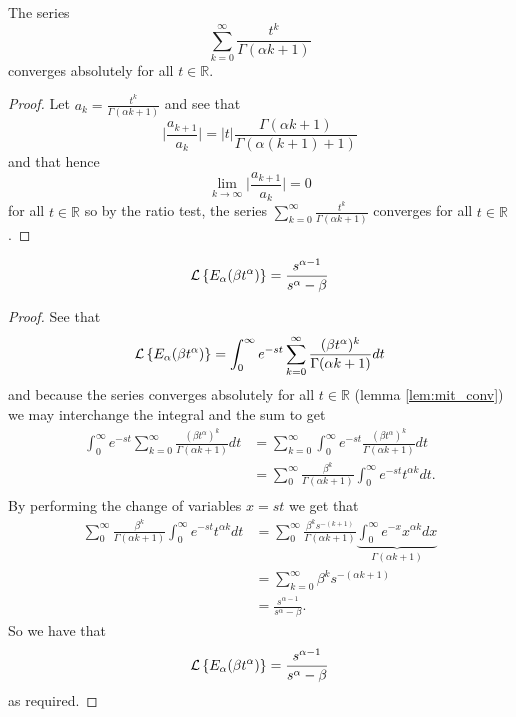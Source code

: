 \documentclass{article}
\begin{document}
\begin{lemma}
\label{lem:mit_conv}

	The series
	$$
		\sum_{k=0}^{\infty} \frac{t^k}{\Gamma(\alpha k + 1)} 
	$$
  	converges absolutely for all $ t \in \mathbb{R} $.
\end{lemma}
\begin{proof}
	Let $ a_k = \frac{t^k}{\Gamma(\alpha k + 1) }$ and see that
	$$ \lvert \frac{a_{k+1}}{a_k} \rvert = |t| \frac{\Gamma(\alpha k + 1) }{\Gamma(\alpha(k+1) + 1)} $$
	and that hence 
	$$
		\lim_{k \longrightarrow \infty} \lvert \frac{a_{k+1}}{a_k} \rvert = 0
	$$
	for all $ t \in \mathbb{R} $ so by the ratio test, the series $ \sum_{k=0}^{\infty} \frac{t^k}{\Gamma(\alpha k + 1)}  $
	converges for all $ t \in \mathbb{R} $.
\end{proof}
\begin{lemma}
\label{lem:lap_mit}

	\begin{align*}	
		\mathcal{L} \left\{  E_\alpha (\beta t^\alpha) \right\} = \frac{s^{\alpha - 1}}{s^\alpha - \beta}
	\end{align*}
\end{lemma}
\begin{proof}
	See that
	\begin{align*}
		\mathcal{L} \left\{  E_\alpha (\beta t^\alpha) \right\} = \int_0^\infty e^{-st} \sum_{k=0}^\infty \frac{(\beta t^\alpha)^k}{\Gamma(\alpha k+1)} dt
	\end{align*}
	and because the series converges absolutely for all $ t \in \mathbb{R} $ (lemma \ref{lem:mit_conv}) we may interchange the integral
	and the sum to get
	\begin{align*}
		\int_0^\infty e^{-st} \sum_{k=0}^\infty \frac{(\beta t^\alpha)^k}{\Gamma(\alpha k+1)} dt &= \sum_{k=0}^\infty \int_0^\infty e^{-st} \frac{(\beta t^\alpha)^k}{\Gamma(\alpha k + 1)} dt \\
			&= \sum_0^\infty \frac{\beta^k}{\Gamma(\alpha k + 1)} \int_0^\infty e^{-st} t^{\alpha k} dt. \\
	\end{align*}
	By performing the change of variables $ x =st $ we get that 
	\begin{align*}
		\sum_0^\infty \frac{\beta^k}{\Gamma(\alpha k + 1)} \int_0^\infty e^{-st} t^{\alpha k} dt 
			&= \sum_0^\infty \frac{\beta^k s^{-(k+1)}}{\Gamma(\alpha k + 1)} \underbrace{\int_0^\infty e^{-x} x^{\alpha k} dx}_{\Gamma(\alpha k + 1)} \\
			&= \sum_{k=0}^\infty \beta^{k} s^{-(\alpha k + 1)} \\
			&= \frac{s^{\alpha-1}}{s^\alpha - \beta}.		
	\end{align*}
	So we have that 
	\begin{align*}	
		\mathcal{L} \left\{  E_\alpha (\beta t^\alpha) \right\} = \frac{s^{\alpha - 1}}{s^\alpha - \beta}
	\end{align*}	
	as required.
\end{proof}
\end{document}
